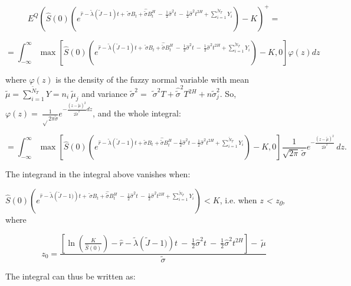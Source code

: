 \documentclass[12pt,a4paper]{report}
\numberwithin{equation}{section}
\begin{document}
\[E^{Q}\left( \widehat{S}(0)(e^{\widehat{r} - \widetilde{\lambda}\left( \widetilde{J} - 1 \right)t + \widetilde{\ \sigma}B_{t} + \widehat{\widetilde{\sigma}}B_{t}^{H}\  - \ \frac{1}{2}{\widehat{\sigma}}^{2}t\  - \ \frac{1}{2}{\widehat{\sigma}}^{2}t^{2H} + \sum_{i = 1}^{{\widetilde{N}}_{T}}Y_{i}}) - K \right)^{+} =\]

\[= \int_{- \infty}^{\infty}{\max\left\lbrack \widehat{S}(0)\left( e^{\widehat{r} - \widetilde{\lambda}\left( \widetilde{J} - 1 \right)t + \widetilde{\ \sigma}B_{t} + \widehat{\widetilde{\sigma}}B_{t}^{H}\ - \ \frac{1}{2}{\widehat{\sigma}}^{2}t\  - \ \frac{1}{2}{\widehat{\sigma}}^{2}t^{2H} + \sum_{i = 1}^{{\widetilde{N}}_{T}}Y_{i}} \right) - K,0 \right\rbrack\varphi(z)dz}\]

where \(\varphi(z)\) is the density of the fuzzy normal variable with
mean
\(\widetilde{\mu} = \sum_{i = 1}^{{\widetilde{N}}_{T}}{Y = n}_{i}\ {\widetilde{\mu}}_{j}\)
and variance
\({\widetilde{\sigma}}^{2} = \ {\widetilde{\ \sigma}}^{2}T + {\widehat{\widetilde{\sigma}}}^{2}T^{2H} + n{\widetilde{\sigma}}_{j}^{2}.\)
So,
\(\varphi(z) = \ \frac{1}{\sqrt{}2\pi\widetilde{\sigma}}e^{- \frac{(z - \widetilde{\mu})^{2}}{2{\widetilde{\sigma}}^{2}}dz}\),
and the whole integral:

\[
= \int_{-\infty}^{\infty}
\max\!\left[\widehat{S}(0)\left(
e^{\widehat{r}-\widetilde{\lambda}\left(\widetilde{J}-1\right)t
+\widetilde{\sigma}B_{t}+\widehat{\widetilde{\sigma}}B_{t}^{H}
-\frac{1}{2}\widehat{\sigma}^{2}t-\frac{1}{2}\widehat{\sigma}^{2}t^{2H}
+\sum_{i=1}^{{\widetilde{N}}_{T}}Y_{i}}
\right)-K,0\right]
\frac{1}{\sqrt{2\pi}\,\widetilde{\sigma}}
e^{-\frac{(z-\widetilde{\mu})^{2}}{2\widetilde{\sigma}^{2}}}\,dz .
\]

The integrand in the integral above vanishes when:

\(\widehat{S}(0)\left( e^{\widehat{r} - \widetilde{\lambda}\left( \widetilde{J} - 1) \right)t + \widetilde{\ \sigma}B_{t} + \widehat{\widetilde{\sigma}}B_{t}^{H}\  - \ \frac{1}{2}{\widehat{\sigma}}^{2}t\  - \ \frac{1}{2}{\widehat{\sigma}}^{2}t^{2H} + \sum_{i = 1}^{{\widetilde{N}}_{T}}Y_{i}} \right) < K\),
i.e. when \emph{z \textless{} z\textsubscript{0},} where

\[z_{0} = \frac{\left\lbrack \ln\left( \frac{K}{\widehat{S}(0)} \right) - \widehat{r} - \widetilde{\lambda}\left( \widetilde{J} - 1) \right)t\  - \ \frac{1}{2}{\widehat{\sigma}}^{2}t\  - \ \frac{1}{2}{\widehat{\sigma}}^{2}t^{2H} \right\rbrack - \ \widetilde{\mu}}{\widetilde{\sigma}}\]

The integral can thus be written as:
\end{document}
